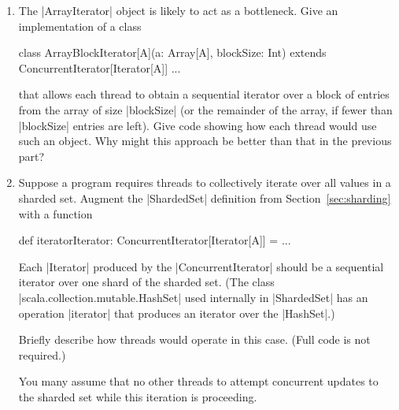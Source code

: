 \begin{question}
\begin{enumerate}

\item
The  |ArrayIterator| object is likely to act as a bottleneck.  Give an
implementation of a class
%
\begin{scala}
class ArrayBlockIterator[A](a: Array[A], blockSize: Int)
    extends ConcurrentIterator[Iterator[A]]{ ... }
\end{scala}
%
that allows each thread to obtain a sequential iterator over a block of entries
from the array of size |blockSize| (or the remainder of the array, if
fewer than |blockSize| entries are left).  Give code showing how each thread
would use such an object.  Why might this approach be better than that in the
previous part? 


\item
Suppose a program requires threads to collectively iterate over all values in
a sharded set.  Augment the |ShardedSet|  definition from
Section~\ref{sec:sharding} with a function
%
\begin{scala}
  def iteratorIterator: ConcurrentIterator[Iterator[A]] = ...
\end{scala}
%
Each |Iterator| produced by the |ConcurrentIterator| should be a sequential
iterator over one shard of the sharded set.  (The class
|scala.collection.mutable.HashSet| used internally in |ShardedSet| has an
operation |iterator| that produces an iterator over the |HashSet|.)

Briefly describe how threads would operate in this case.  (Full code is not
required.)  

You many assume that no other threads to attempt concurrent updates to the
sharded set while this iteration is proceeding.
\end{enumerate}
\end{question}


